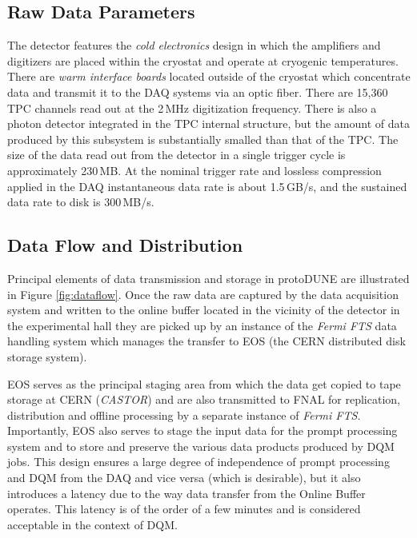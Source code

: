 \documentclass[pdftex,12pt,letter]{article}
\newcommand{\pd}{protoDUNE\xspace}
\begin{document}
\subsection{Raw Data Parameters}
\label{sec:np04_data_rate}

The detector features the \textit{cold electronics} design in which the amplifiers and digitizers
are placed within the cryostat and operate at cryogenic temperatures. There are
\textit{warm interface boards} located outside of the cryostat which concentrate data
and transmit it to the DAQ systems via an optic fiber.
There are 15,360 TPC channels read out at the 2\,MHz digitization frequency. There is also
a photon detector integrated in the TPC internal structure, but the amount of data
produced by this subsystem is substantially smalled than that of the TPC.
The size of the data read out from the detector in a single trigger cycle is approximately 230\,MB. At the nominal
trigger rate and lossless compression applied in the DAQ instantaneous data rate is about
1.5\,GB/s, and the sustained data rate to disk is 300\,MB/s.

\subsection{Data Flow and Distribution}
Principal elements of data transmission and storage in \pd are illustrated in Figure \ref{fig:dataflow}.
Once the raw data are captured by the data acquisition system and written to the online buffer
located in the vicinity of the detector in the experimental hall  they are picked up by an instance of
the \textit{Fermi FTS} data handling system \cite{sam,fts} which manages the transfer to EOS \cite{castoreos}
(the CERN distributed disk storage system).

EOS serves as the principal staging area  \cite{eos_role} from which the data get copied to tape
storage at CERN (\textit{CASTOR})  and are also transmitted to FNAL for replication, distribution and
offline processing by a separate instance of \textit{Fermi FTS}.
Importantly, EOS also serves to stage the input data for the prompt processing system and to
store and preserve  the various data products produced by DQM jobs. This design
ensures a large degree of independence of prompt processing and DQM from the DAQ and vice
versa (which is desirable),
but it also introduces a latency due to the way data transfer from the Online Buffer operates. This latency
is of the order of a few minutes and is considered acceptable in the context of DQM.
\end{document}
